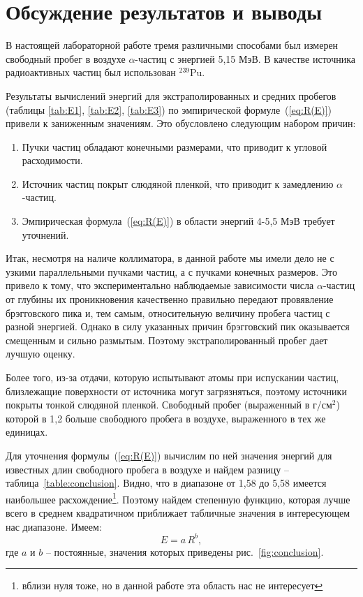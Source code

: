 \documentclass[a4paper,12pt]{article} %
\begin{document}
\section{Обсуждение результатов и выводы}
	В настоящей лабораторной работе тремя различными способами был измерен свободный пробег в воздухе $\alpha$-частиц  с энергией 5,15 МэВ. В качестве источника радиоактивных частиц был использован $^{239}$Pu.
	
	Результаты вычислений энергий для экстраполированных и средних пробегов (таблицы \ref{tab:E1}, \ref{tab:E2}, \ref{tab:E3}) по эмпирической формуле~(\ref{eq:R(E)}) привели к заниженным значениям. Это обусловлено следующим набором причин:
	\begin{enumerate}
		\item
			Пучки частиц обладают конечными размерами, что приводит к угловой расходимости.
		\item
			Источник частиц покрыт слюдяной пленкой, что приводит к замедлению $\alpha$-частиц.
		\item
			Эмпирическая формула~(\ref{eq:R(E)}) в области энергий 4-5,5 МэВ требует уточнений.
	\end{enumerate}

	Итак, несмотря на наличе коллиматора, в данной работе мы имели дело не с узкими параллельными пучками частиц, а с пучками конечных размеров. Это привело к тому, что экспериментально наблюдаемые зависимости числа $\alpha$-частиц от глубины их проникновения качественно правильно передают провявление брэгговского пика и, тем самым, относительную величину пробега частиц с разной энергией. Однако в силу указанных причин брэгговский пик оказывается смещенным и сильно размытым. Поэтому экстраполированный пробег дает лучшую оценку.
	
	Более того, из-за отдачи, которую испытывают атомы при испускании частиц, близлежащие поверхности от источника могут загрязняться, поэтому источники покрыты тонкой слюдяной пленкой. Свободный пробег (выраженный в г/см$^2$) которой в 1,2 больше свободного пробега в воздухе, выраженного в тех же единицах.
	
	Для уточнения формулы~(\ref{eq:R(E)}) вычислим по ней значения энергий для известных длин свободного пробега в воздухе и найдем разницу -- таблица~\ref{table:conclusion}. Видно, что в диапазоне от 1,58 до 5,58 имеется наибольшее расхождение\footnote{вблизи нуля тоже, но в данной работе эта область нас не интересует}. Поэтому найдем степенную функцию, которая лучше всего в среднем квадратичном приближает табличные значения в интересующем нас диапазоне. Имеем:
	\begin{equation}
		\tag{$\star \star$}
		E = a\,R^{b},
	\end{equation}
	где $a$ и $b$ -- постоянные, значения которых приведены рис.~\ref{fig:conclusion}.
	
\end{document}
